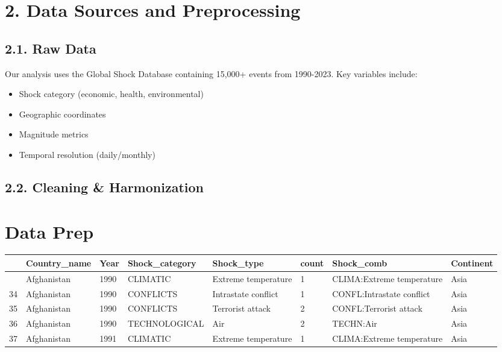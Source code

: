 \documentclass[
]{article}
\begin{document}
\section{2. Data Sources and
Preprocessing}\label{data-sources-and-preprocessing}

\subsection{2.1. Raw Data}\label{raw-data}

Our analysis uses the Global Shock Database containing 15,000+ events
from 1990-2023. Key variables include:

\begin{itemize}
\item
  Shock category (economic, health, environmental)
\item
  Geographic coordinates
\item
  Magnitude metrics
\item
  Temporal resolution (daily/monthly)
\end{itemize}

\subsection{2.2. Cleaning \&
Harmonization}\label{cleaning-harmonization}

\section{Data Prep}\label{data-prep}

\begin{longtable}[]{@{}llllllll@{}}
\toprule\noalign{}
& Country\_name & Year & Shock\_category & Shock\_type & count &
Shock\_comb & Continent \\
\midrule\noalign{}
\endhead
\bottomrule\noalign{}
\endlastfoot
33 & Afghanistan & 1990 & CLIMATIC & Extreme temperature & 1 &
CLIMA:Extreme temperature & Asia \\
34 & Afghanistan & 1990 & CONFLICTS & Intrastate conflict & 1 &
CONFL:Intrastate conflict & Asia \\
35 & Afghanistan & 1990 & CONFLICTS & Terrorist attack & 2 &
CONFL:Terrorist attack & Asia \\
36 & Afghanistan & 1990 & TECHNOLOGICAL & Air & 2 & TECHN:Air & Asia \\
37 & Afghanistan & 1991 & CLIMATIC & Extreme temperature & 1 &
CLIMA:Extreme temperature & Asia \\
\end{longtable}
\end{document}
